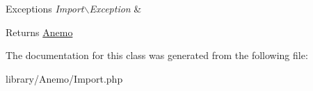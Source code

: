 \begin{DoxyExceptions}{Exceptions}
{\em Import$\backslash$Exception} & \\
\hline
\end{DoxyExceptions}
\begin{DoxyReturn}{Returns}
\hyperlink{namespace_anemo}{Anemo} 
\end{DoxyReturn}


The documentation for this class was generated from the following file:\begin{DoxyCompactItemize}
\item 
library/Anemo/Import.php\end{DoxyCompactItemize}
